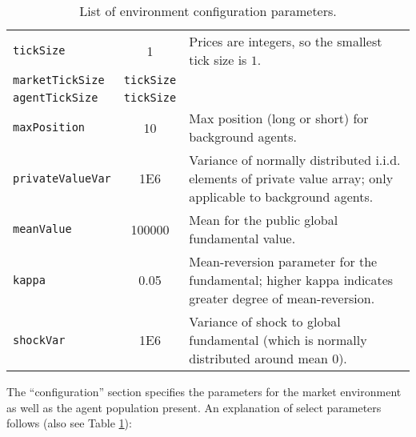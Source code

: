 \documentclass[11pt]{article}
\begin{document}
\begin{table}
\begin{tabular}[f]{p{} c p{}}
\verb|tickSize| 		& 1 & Prices are integers, so the smallest tick size is $1$. \\
\verb|marketTickSize| & \verb|tickSize|& \\
\verb|agentTickSize| & \verb|tickSize|& \\

\verb|maxPosition| 	& 10 & Max position (long or short) for background agents. \\
\verb|privateValueVar| & 1E6 & Variance of normally distributed i.i.d. elements of private value array; only applicable to background agents. \\
\verb|meanValue| 	& 100000 & Mean for the public global fundamental value.\\
\verb|kappa| 		& 0.05 & Mean-reversion parameter for the fundamental; higher kappa indicates greater degree of mean-reversion.\\
\verb|shockVar| 		& 1E6 & Variance of shock to global fundamental (which is normally distributed around mean 0).\\



\end{tabular}
\caption{List of environment configuration parameters.}
\label{tab:configs}
\end{table}

The ``configuration'' section specifies the parameters for the market environment as well as the agent population present.
%
An explanation of select parameters follows (also see Table \ref{tab:configs}):
\end{document}
